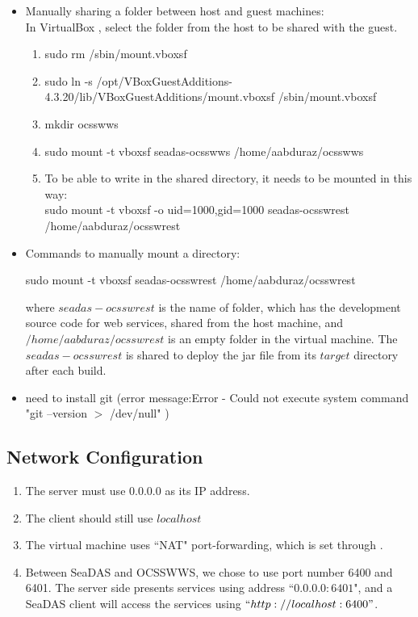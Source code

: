 \documentclass[11pt, oneside]{article}   	%
\begin{document}
\begin{itemize}

\item Manually sharing a folder between host and guest machines: \\
In VirtualBox {\color{blue}{\bf Devices  $\rightarrow $  Shared Folder Settings...  $\rightarrow $ Shared Folders  $\rightarrow $  Machine Folders}}, select the folder from the host to be shared with the guest.
   \begin{enumerate}
      \item sudo rm /sbin/mount.vboxsf
      \item sudo ln -s /opt/VBoxGuestAdditions-4.3.20/lib/VBoxGuestAdditions/mount.vboxsf /sbin/mount.vboxsf
      \item mkdir ocsswws
      \item sudo mount -t vboxsf seadas-ocsswws /home/aabduraz/ocsswws
      \item To be able to write in the shared directory, it needs to be mounted in this way:\\
      sudo mount -t vboxsf -o uid=1000,gid=1000 seadas-ocsswrest /home/aabduraz/ocsswrest

   \end{enumerate}

\item Commands to manually mount a directory:
\begin{code}
sudo mount -t vboxsf seadas-ocsswrest /home/aabduraz/ocsswrest
\end{code}
where $seadas-ocsswrest$ is the name of folder, which has the development source code for web services, shared from the host machine, and $/home/aabduraz/ocsswrest$ is an empty folder in the virtual machine. The  $seadas-ocsswrest$ is shared to deploy the jar file from its $target$ directory after each build.

\item need to install git
(error message:Error - Could not execute system command "git --version $>$ /dev/null" )

\end{itemize}

\subsection{Network Configuration}
\begin{enumerate}
\item The server must use $0.0.0.0$ as its IP address.
\item The client should still use $localhost$
\item The virtual machine uses ``NAT" port-forwarding, which is set through {\color{blue}{\bf Devices $\rightarrow$ Network $\rightarrow$ Network Settings ... }}.
\item  Between SeaDAS and OCSSWWS, we chose to use port number 6400 and 6401. The server side presents services using address ``$0.0.0.0:6401$", and a SeaDAS client will access the services using $``http://localhost:6400"$.
\end{enumerate}
\end{document}
